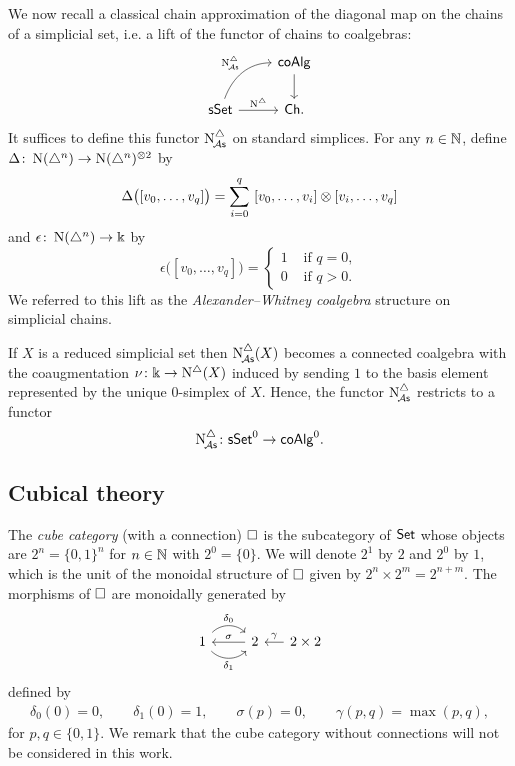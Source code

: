 We now recall a classical chain approximation of the diagonal map on the chains of a simplicial set, i.e. a lift of the functor of chains to coalgebras:
\[
\begin{tikzcd}
	& \coAlg \arrow[d] \\
	\sSet \arrow[r, "\schains"] \arrow[ur, "\schainsA", out=70, in=180] & \Ch.
\end{tikzcd}
\]
It suffices to define this functor $\operatorname{N^{\triangle}_{\!{\mathcal{A}\mathsf{s}}}}$ on standard simplices.
 For any $n \in \mathbb{N}$, define $\Delta \colon \operatorname{N}(\triangle^n) \to \operatorname{N}(\triangle^n)^{\otimes2}$ by
\[
\Delta \big( [v_0, \dots, v_q] \big) = \sum_{i=0}^q \ [v_0, \dots, v_i] \otimes [v_i, \dots, v_q]
\]
and $\epsilon \colon \operatorname{N}(\triangle^n) \to \Bbbk$ by
\[
\epsilon \big( [v_0, \dots, v_q] \big) = \begin{cases} 1 & \text{ if } q = 0, \\ 0 & \text{ if } q>0. \end{cases}
\]
We referred to this lift as the \textit{Alexander--Whitney coalgebra} structure on simplicial chains.

If $X$ is a reduced simplicial set then $\operatorname{N^{\triangle}_{\!{\mathcal{A}\mathsf{s}}}}(X)$ becomes a connected coalgebra with the coaugmentation $\nu \colon \Bbbk \to \operatorname{N^{\triangle}}(X)$ induced by sending $1$ to the basis element represented by the unique $0$-simplex of $X$.
Hence, the functor $\operatorname{N^{\triangle}_{\!{\mathcal{A}\mathsf{s}}}}$ restricts to a functor
\[
\operatorname{N^{\triangle}_{\!{\mathcal{A}\mathsf{s}}}} \colon \mathsf{sSet}^0 \to \mathsf{coAlg}^0.
\]

\subsection{Cubical theory}\label{ss:cubical}

The \textit{cube category} (with a connection) $\square$ is the subcategory of $\mathsf{Set}$ whose objects are $2^n = \{0, 1\}^n$ for $n \in \mathbb{N}$ with $2^0 = \{0\}$.
We will denote $2^1$ by $2$ and $2^0$ by $1$, which is the unit of the monoidal structure of $\square$ given by $2^n \times 2^m = 2^{n+m}$.
The morphisms of $\square$ are monoidally generated by
\begin{equation}\label{eq:cube generators}
	\begin{tikzcd}
		1 \arrow[r, out=45, in=135, "\delta_0"] \arrow[r, out=-45, in=-135, "\delta_1"'] & 2 \arrow[l, "\sigma"'] &[-10pt] \arrow[l, "\gamma"'] 2 \times 2
	\end{tikzcd}
\end{equation}
defined by
\begin{gather*}
	\delta_0(0) = 0, \qquad
	\delta_1(0) = 1, \qquad
	\sigma(p) = 0, \qquad
	\gamma(p,q) = \max(p,q),
\end{gather*}
for $p,q \in \{0,1\}$.
We remark that the cube category without connections will not be considered in this work.

